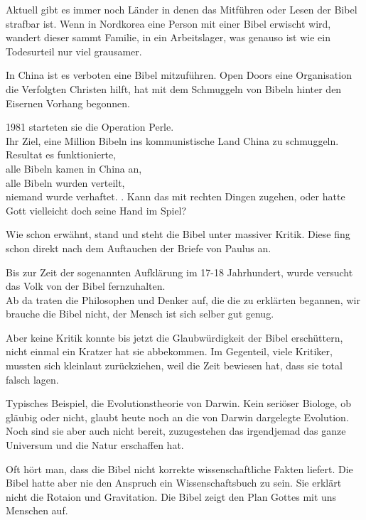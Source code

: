 \documentclass[fontsize=16pt]{mybib}
\begin{document}
\begin{otsblock}
    Aktuell gibt es immer noch Länder in denen das Mitführen oder Lesen der Bibel strafbar ist. Wenn in Nordkorea eine Person mit einer Bibel erwischt wird, wandert dieser sammt Familie, in ein Arbeitslager, was genauso ist wie ein Todesurteil nur viel grausamer.

    In China ist es verboten eine Bibel mitzuführen. Open Doors eine Organisation die Verfolgten Christen hilft, hat mit dem Schmuggeln von Bibeln hinter den Eisernen Vorhang begonnen.
    
    1981 starteten sie die Operation Perle.\\
    Ihr Ziel, eine Million Bibeln ins kommunistische Land China zu schmuggeln. \\
    Resultat es funktionierte, \\
    alle Bibeln kamen in China an, \\
    alle Bibeln wurden verteilt, \\
    niemand wurde verhaftet. . Kann das mit rechten Dingen zugehen, oder hatte Gott vielleicht doch seine Hand im Spiel?

    Wie schon erwähnt, stand und steht die Bibel unter massiver Kritik. Diese fing schon direkt nach dem Auftauchen der Briefe von Paulus an.

    Bis zur Zeit der sogenannten Aufklärung im 17-18 Jahrhundert, wurde versucht das Volk von der Bibel fernzuhalten.\\
    Ab da traten die Philosophen und Denker auf, die die zu erklärten begannen, wir brauche die Bibel nicht, der Mensch ist sich selber gut genug.

    Aber keine Kritik konnte bis jetzt die Glaubwürdigkeit der Bibel erschüttern, nicht einmal ein Kratzer hat sie abbekommen. Im Gegenteil, viele Kritiker, mussten sich kleinlaut zurückziehen, weil die Zeit bewiesen hat, dass sie total falsch lagen.

    Typisches Beispiel, die Evolutionstheorie von Darwin. Kein seriöser Biologe, ob gläubig oder nicht, glaubt heute noch an die von Darwin dargelegte Evolution. Noch sind sie aber auch nicht bereit, zuzugestehen das irgendjemad das ganze Universum und die Natur erschaffen hat.

    Oft hört man, dass die Bibel nicht korrekte wissenschaftliche Fakten liefert. Die Bibel hatte aber nie den Anspruch ein Wissenschaftsbuch zu sein. Sie erklärt nicht die Rotaion und Gravitation. Die Bibel zeigt den Plan Gottes mit uns Menschen auf.\\


\end{otsblock}
\end{document}
